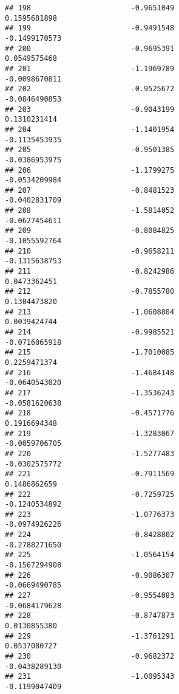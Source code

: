 \documentclass[
]{article}
\begin{document}
\begin{verbatim}
## 198                       -0.9651049                          0.1595681898
## 199                       -0.9491548                         -0.1499170573
## 200                       -0.9695391                          0.0549575468
## 201                       -1.1969789                         -0.0098670811
## 202                       -0.9525672                         -0.0846490853
## 203                       -0.9043199                          0.1310231414
## 204                       -1.1401954                         -0.1135453935
## 205                       -0.9501385                         -0.0386953975
## 206                       -1.1799275                         -0.0534209984
## 207                       -0.8481523                         -0.0402831709
## 208                       -1.5814052                         -0.0627454611
## 209                       -0.8084825                         -0.1055592764
## 210                       -0.9658211                         -0.1315638753
## 211                       -0.8242986                          0.0473362451
## 212                       -0.7855780                          0.1304473820
## 213                       -1.0608804                          0.0039424744
## 214                       -0.9985521                         -0.0716065918
## 215                       -1.7010085                          0.2259471374
## 216                       -1.4684148                         -0.0640543020
## 217                       -1.3536243                         -0.0581620638
## 218                       -0.4571776                          0.1916694348
## 219                       -1.3283067                         -0.0059706705
## 220                       -1.5277483                         -0.0302575772
## 221                       -0.7911569                          0.1486862659
## 222                       -0.7259725                         -0.1240534892
## 223                       -1.0776373                         -0.0974926226
## 224                       -0.8428802                         -0.2788271650
## 225                       -1.0564154                         -0.1567294908
## 226                       -0.9086307                         -0.0669490785
## 227                       -0.9554083                         -0.0684179628
## 228                       -0.8747873                          0.0130855380
## 229                       -1.3761291                          0.0537080727
## 230                       -0.9682372                         -0.0438289130
## 231                       -1.0095343                         -0.1199047409

\end{verbatim}
\end{document}

